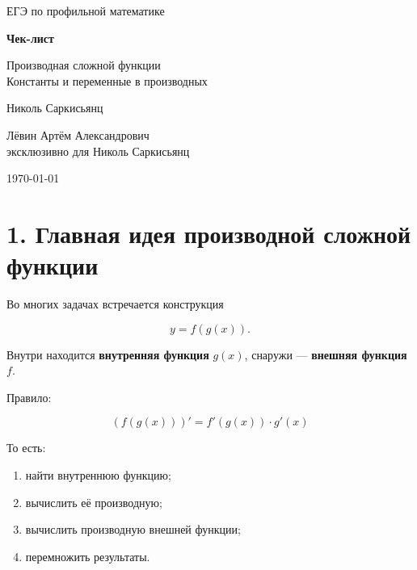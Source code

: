 \documentclass[a4paper,12pt]{article}
\begin{document}
\begin{titlepage}
\centering

\vspace*{2cm}

{\Large ЕГЭ по профильной математике\par}

\vspace{1cm}

{\huge\bfseries Чек-лист\par}

\vspace{0.5cm}

{\Large Производная сложной функции\\
Константы и переменные в производных}

\vspace{2cm}

{\large
Николь Саркисьянц
}

\vfill

{\large
Лёвин Артём Александрович\\
эксклюзивно для Николь Саркисьянц
}

\vspace{1cm}

{\large \today}

\vspace{1.5cm}


\end{titlepage}

\section*{1. Главная идея производной сложной функции}

Во многих задачах встречается конструкция

\[
y=f(g(x)).
\]

Внутри находится \textbf{внутренняя функция} $g(x)$, снаружи --- \textbf{внешняя функция} $f$.

Правило:

\[
\boxed{(f(g(x)))'=f'(g(x))\cdot g'(x)}
\]

То есть:

\begin{enumerate}
\item найти внутреннюю функцию;
\item вычислить её производную;
\item вычислить производную внешней функции;
\item перемножить результаты.
\end{enumerate}
\end{document}
